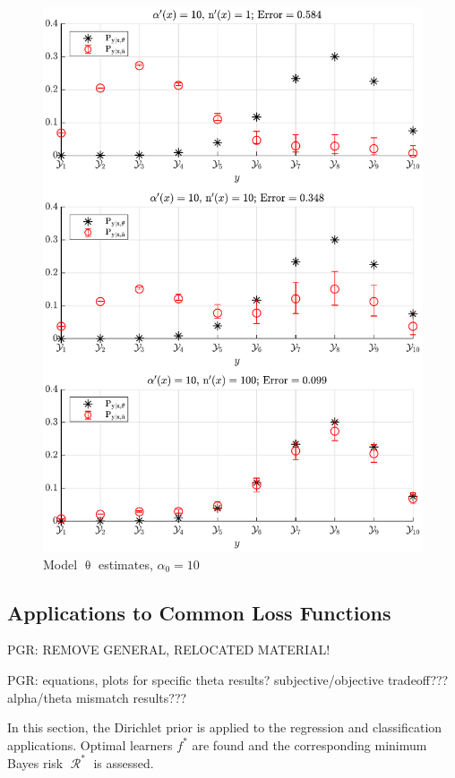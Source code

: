\documentclass[12pt]{article}
\DeclareMathOperator{\Rcal}{\mathcal{R}}
\begin{document}
\begin{figure}
\centering
\includegraphics[width=0.7\linewidth]{P_yx_error_a0_10.pdf}
\caption{Model $\uptheta$ estimates, $\alpha_0 = 10$}
\label{fig:P_yx_error_a0_10}
\end{figure}
















\subsection{Applications to Common Loss Functions}

PGR: REMOVE GENERAL, RELOCATED MATERIAL!

PGR: equations, plots for specific theta results? subjective/objective tradeoff??? alpha/theta mismatch results???

In this section, the Dirichlet prior is applied to the regression and classification applications. Optimal learners $f^*$ are found and the corresponding minimum Bayes risk $\Rcal^*$ is assessed.
\end{document}
